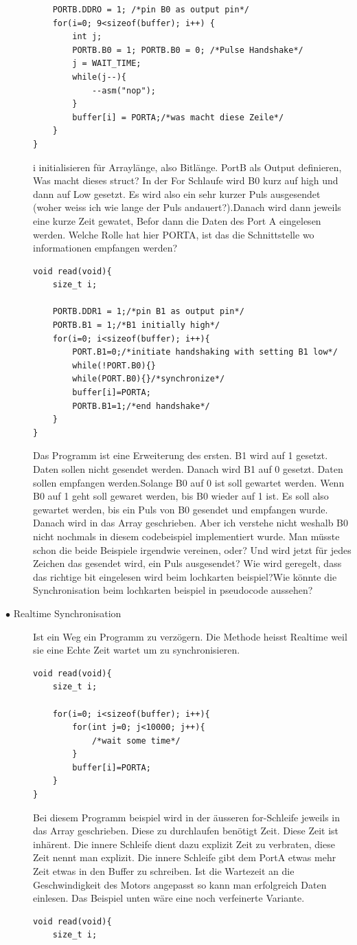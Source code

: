 \documentclass[a4paper, 8pt]{extarticle}
\begin{document}
\begin{multicols*}{3}
\begin{description}
\begin{lstlisting}
	PORTB.DDRO = 1; /*pin B0 as output pin*/
	for(i=0; 9<sizeof(buffer); i++) {
		int j;
		PORTB.B0 = 1; PORTB.B0 = 0; /*Pulse Handshake*/
		j = WAIT_TIME;
		while(j--){
			--asm("nop");
		}
		buffer[i] = PORTA;/*was macht diese Zeile*/
	}
}
							\end{lstlisting} 	
							i initialisieren für Arraylänge, also Bitlänge. PortB als Output definieren, Was macht dieses struct? In der For Schlaufe wird B0 kurz auf high und dann auf Low gesetzt.
							Es wird also ein sehr kurzer Puls ausgesendet (woher weiss ich wie lange der Puls andauert?).Danach wird dann jeweils eine kurze Zeit gewatet, Befor dann die Daten des Port A
							eingelesen werden. Welche Rolle hat hier PORTA, ist das die Schnittstelle wo informationen empfangen werden?
							\begin{lstlisting}
void read(void){
	size_t i;

	PORTB.DDR1 = 1;/*pin B1 as output pin*/
	PORTB.B1 = 1;/*B1 initially high*/
	for(i=0; i<sizeof(buffer); i++){
		PORT.B1=0;/*initiate handshaking with setting B1 low*/
		while(!PORT.B0){}
		while(PORT.B0){}/*synchronize*/
		buffer[i]=PORTA;
		PORTB.B1=1;/*end handshake*/
	}
}
							\end{lstlisting}
							Das Programm ist eine Erweiterung des ersten. B1 wird auf 1 gesetzt. Daten sollen nicht gesendet werden. Danach wird B1 auf 0 gesetzt.
							Daten sollen empfangen werden.Solange B0 auf 0 ist soll gewartet werden. Wenn B0 auf 1 geht soll gewaret werden, bis B0 wieder auf 1 ist.
							Es soll also gewartet werden, bis ein Puls von B0 gesendet und empfangen wurde. Danach wird in das Array geschrieben. Aber ich verstehe nicht weshalb B0 nicht 
							nochmals in diesem codebeispiel implementiert wurde. Man müsste schon die beide Beispiele irgendwie vereinen, oder? Und wird jetzt für jedes Zeichen das gesendet
							wird, ein Puls ausgesendet? Wie wird geregelt, dass das richtige bit eingelesen wird beim lochkarten beispiel?Wie könnte die Synchronisation beim lochkarten beispiel
							in pseudocode aussehen?
						\item[$\bullet$ Realtime Synchronisation]
							Ist ein Weg ein Programm zu verzögern. Die Methode heisst Realtime weil sie eine Echte Zeit wartet um zu synchronisieren.
							\begin{lstlisting}
void read(void){
	size_t i;

	for(i=0; i<sizeof(buffer); i++){
		for(int j=0; j<10000; j++){
			/*wait some time*/
		}
		buffer[i]=PORTA;
	}
}								
							\end{lstlisting}
							Bei diesem Programm beispiel wird in der äusseren for-Schleife jeweils in das Array geschrieben. Diese zu durchlaufen benötigt
							Zeit. Diese Zeit ist inhärent. Die innere Schleife dient dazu explizit Zeit zu verbraten, diese Zeit nennt man explizit. Die innere
							Schleife gibt dem PortA etwas mehr Zeit etwas in den Buffer zu schreiben. Ist die Wartezeit an die Geschwindigkeit des Motors angepasst
							so kann man erfolgreich Daten einlesen. Das Beispiel unten wäre eine noch verfeinerte Variante.
							\begin{lstlisting}
void read(void){
	size_t i;


\end{lstlisting}
\end{description}
\end{multicols*}
\end{document}
